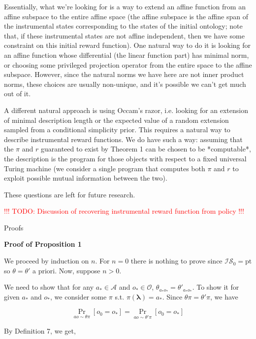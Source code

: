 \documentclass[a4paper]{article}
\newcommand{\Co}[1]{}
\newcommand{\AB}[1]{\left[#1\right]}
\newcommand{\Pa}[2]{\underset{#1}{\operatorname{Pr}}\AB{#2}}
\newcommand{\Pt}{\boldsymbol{\mathrm{pt}}}
\newcommand{\Estr}{\boldsymbol{\lambda}} %
\newcommand{\A}{\mathcal{A}}
\newcommand{\Ob}{\mathcal{O}}
\newcommand{\IS}{\mathcal{IS}}
\begin{document}
Essentially, what we're looking for is a way to extend an affine function from an affine subspace to the entire affine space (the affine subspace is the affine span of the instrumental states corresponding to the states of the initial ontology; note that, if these instrumental states are not affine independent, then we have some constraint on this initial reward function). One natural way to do it is looking for an affine function whose differential (the linear function part) has minimal norm, or choosing some privileged projection operator from the entire space to the affine subspace. However, since the natural norms we have here are not inner product norms, these choices are usually non-unique, and it's possible we can't get much out of it.

A different natural approach is using Occam's razor, i.e. looking for an extension of minimal description length or the expected value of a random extension sampled from a conditional simplicity prior. This requires a natural way to describe instrumental reward functions. We do have such a way: assuming that the $\pi$ and $r$ guaranteed to exist by Theorem 1 can be chosen to be *computable*, the description is the program for those objects with respect to a fixed universal Turing machine (we consider a single program that computes both $\pi$ and $r$ to exploit possible mutual information between the two).

These questions are left for future research.

\textcolor{red}{!!! TODO: Discussion of recovering instrumental reward function from policy !!!}

\begin{Huge}Proofs\end{Huge}

\textbf{Proof of Proposition 1}\Co{b}

We proceed by induction on $n$. For $n=0$ there is nothing to prove since $\IS_0=\Pt$ so $\theta=\theta'$ a priori. Now, suppose $n>0$.

We need to show that for any $a_*\in\A$ and $o_*\in\Ob$, $\theta_{a_*o_*}=\theta'_{a_*o_*}$. To show it for given $a_*$ and $o_*$, we consider some $\pi$ s.t. $\pi(\Estr)=a_*$. Since $\theta\pi=\theta'\pi$, we have

$$\Pa{ao\sim\theta\pi}{o_0=o_*}=\Pa{ao\sim\theta'\pi}{o_0=o_*}$$

By Definition 7, we get,
\end{document}
